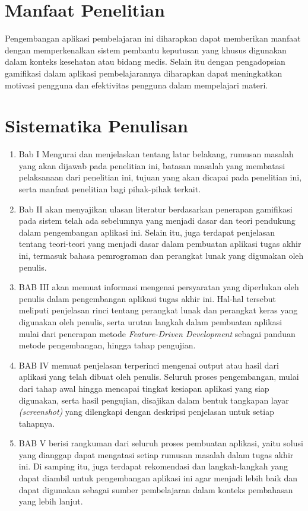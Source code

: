 \section{Manfaat Penelitian}
Pengembangan aplikasi pembelajaran ini diharapkan dapat memberikan manfaat dengan memperkenalkan sistem pembantu keputusan yang khusus digunakan dalam konteks kesehatan atau bidang medis.
Selain itu dengan pengadopsian gamifikasi dalam aplikasi pembelajarannya diharapkan dapat meningkatkan motivasi pengguna dan efektivitas pengguna dalam mempelajari materi.

\section{Sistematika Penulisan}
\begin{enumerate}
	\item Bab I Mengurai dan menjelaskan tentang latar belakang, rumusan 
	masalah yang akan dijawab pada penelitian ini, batasan masalah yang membatasi 
	pelaksanaan dari penelitian ini, tujuan yang akan dicapai pada penelitian ini, serta manfaat 
	penelitian bagi pihak-pihak terkait.
	\item Bab II akan menyajikan ulasan literatur berdasarkan penerapan gamifikasi pada sistem telah ada sebelumnya yang menjadi dasar dan teori pendukung dalam pengembangan aplikasi ini.
	Selain itu, juga terdapat penjelasan tentang teori-teori yang menjadi dasar dalam pembuatan aplikasi tugas akhir ini, 
	termasuk bahasa pemrograman dan perangkat lunak yang digunakan oleh penulis.
	\item BAB III akan memuat informasi mengenai persyaratan yang diperlukan oleh penulis dalam pengembangan aplikasi tugas akhir ini.
	Hal-hal tersebut meliputi penjelasan rinci tentang perangkat lunak dan perangkat keras yang digunakan oleh penulis, 
	serta urutan langkah dalam pembuatan aplikasi mulai dari penerapan metode \textit{Feature-Driven Development} sebagai panduan metode pengembangan, hingga tahap pengujian.
	\item BAB IV memuat penjelasan terperinci mengenai output atau hasil dari aplikasi yang telah dibuat oleh penulis.
	Seluruh proses pengembangan, mulai dari tahap awal hingga mencapai tingkat kesiapan aplikasi yang siap digunakan, serta hasil pengujian, 
	disajikan dalam bentuk tangkapan layar \textit{(screenshot)} yang dilengkapi dengan deskripsi penjelasan untuk setiap tahapnya.
	\item BAB V berisi rangkuman dari seluruh proses pembuatan aplikasi, yaitu solusi yang dianggap dapat mengatasi setiap rumusan masalah dalam tugas akhir ini.
	Di samping itu, juga terdapat rekomendasi dan langkah-langkah yang dapat diambil untuk pengembangan aplikasi ini agar menjadi lebih baik dan dapat digunakan sebagai sumber pembelajaran dalam konteks pembahasan yang lebih lanjut.
\end{enumerate}

